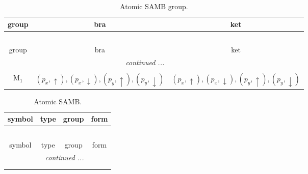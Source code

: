 \documentclass[fleqn,10pt,landscape]{article}
\begin{document}
\begin{itemize}
\begin{dmath*}
\end{dmath*}
\begin{center}
\renewcommand{\arraystretch}{1.3}
\begin{longtable}{c|c|c}
\caption{Atomic SAMB group.}
 \\
 \hline \hline
group & bra & ket \\ \hline \endfirsthead

\multicolumn{2}{l}{\tablename\ \thetable{}} \\
 \hline \hline
group & bra & ket \\ \hline \endhead

 \hline \hline
\multicolumn{2}{r}{\footnotesize\it continued ...} \\ \endfoot

 \hline \hline
\multicolumn{2}{r}{} \\ \endlastfoot

M$_{1}$ & $(p_{x},\uparrow), (p_{x},\downarrow), (p_{y},\uparrow), (p_{y},\downarrow)$ & $(p_{x},\uparrow), (p_{x},\downarrow), (p_{y},\uparrow), (p_{y},\downarrow)$ \\
\end{longtable}
\end{center}
\begin{center}
\renewcommand{\arraystretch}{1.3}
\begin{longtable}{c|c|c|c}
\caption{Atomic SAMB.}
 \\
 \hline \hline
symbol & type & group & form \\ \hline \endfirsthead

\multicolumn{3}{l}{\tablename\ \thetable{}} \\
 \hline \hline
symbol & type & group & form \\ \hline \endhead

 \hline \hline
\multicolumn{3}{r}{\footnotesize\it continued ...} \\ \endfoot

 \hline \hline
\multicolumn{3}{r}{} \\ \endlastfoot


\end{longtable}
\end{center}
\end{itemize}
\end{document}

